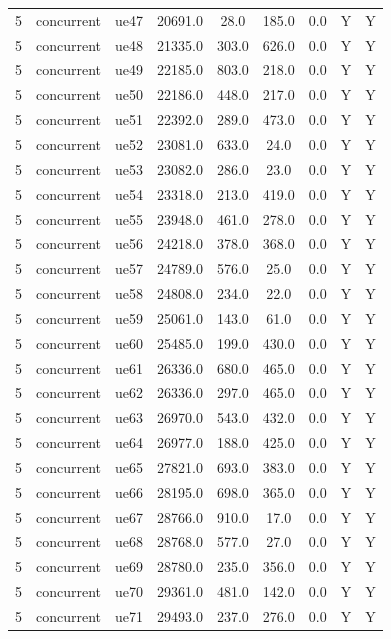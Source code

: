 \begin{table}[ht]
\begin{tabular}{|c|c|c|c|c|c|c|c|c|}
5 & concurrent & ue47 & 20691.0 & 28.0 & 185.0 & 0.0 & Y & Y \\
5 & concurrent & ue48 & 21335.0 & 303.0 & 626.0 & 0.0 & Y & Y \\
5 & concurrent & ue49 & 22185.0 & 803.0 & 218.0 & 0.0 & Y & Y \\
5 & concurrent & ue50 & 22186.0 & 448.0 & 217.0 & 0.0 & Y & Y \\
5 & concurrent & ue51 & 22392.0 & 289.0 & 473.0 & 0.0 & Y & Y \\
5 & concurrent & ue52 & 23081.0 & 633.0 & 24.0 & 0.0 & Y & Y \\
5 & concurrent & ue53 & 23082.0 & 286.0 & 23.0 & 0.0 & Y & Y \\
5 & concurrent & ue54 & 23318.0 & 213.0 & 419.0 & 0.0 & Y & Y \\
5 & concurrent & ue55 & 23948.0 & 461.0 & 278.0 & 0.0 & Y & Y \\
5 & concurrent & ue56 & 24218.0 & 378.0 & 368.0 & 0.0 & Y & Y \\
5 & concurrent & ue57 & 24789.0 & 576.0 & 25.0 & 0.0 & Y & Y \\
5 & concurrent & ue58 & 24808.0 & 234.0 & 22.0 & 0.0 & Y & Y \\
5 & concurrent & ue59 & 25061.0 & 143.0 & 61.0 & 0.0 & Y & Y \\
5 & concurrent & ue60 & 25485.0 & 199.0 & 430.0 & 0.0 & Y & Y \\
5 & concurrent & ue61 & 26336.0 & 680.0 & 465.0 & 0.0 & Y & Y \\
5 & concurrent & ue62 & 26336.0 & 297.0 & 465.0 & 0.0 & Y & Y \\
5 & concurrent & ue63 & 26970.0 & 543.0 & 432.0 & 0.0 & Y & Y \\
5 & concurrent & ue64 & 26977.0 & 188.0 & 425.0 & 0.0 & Y & Y \\
5 & concurrent & ue65 & 27821.0 & 693.0 & 383.0 & 0.0 & Y & Y \\
5 & concurrent & ue66 & 28195.0 & 698.0 & 365.0 & 0.0 & Y & Y \\
5 & concurrent & ue67 & 28766.0 & 910.0 & 17.0 & 0.0 & Y & Y \\
5 & concurrent & ue68 & 28768.0 & 577.0 & 27.0 & 0.0 & Y & Y \\
5 & concurrent & ue69 & 28780.0 & 235.0 & 356.0 & 0.0 & Y & Y \\
5 & concurrent & ue70 & 29361.0 & 481.0 & 142.0 & 0.0 & Y & Y \\
5 & concurrent & ue71 & 29493.0 & 237.0 & 276.0 & 0.0 & Y & Y \\

\end{tabular}
\end{table}
